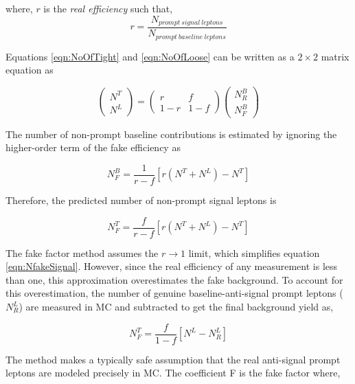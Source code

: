 where, $r$ is the \textit{real efficiency} such that, 
\begin{equation} 
    r=\frac{N_{prompt~signal~leptons}}{N_{prompt~baseline~leptons}}
\end{equation}

Equations \ref{eqn:NoOfTight} and \ref{eqn:NoOfLoose} can be written as a $2 \times 2$ matrix equation as

\begin{equation}
    \begin{pmatrix} N^{T} \\ N^{L} \end{pmatrix} =  \begin{pmatrix} r & f \\ 1-r & 1-f \end{pmatrix} \begin{pmatrix} N^{B}_{R} \\ N^{B}_{F}\end{pmatrix}
    \label{eqn:RealFakeLepton}
\end{equation}

The number of non-prompt baseline contributions is estimated by ignoring the higher-order term of the fake efficiency as

\begin{equation}
    N_{F}^{B} =  \frac{1}{r-f}[r(N^{T}+N^{L})-N^{T}]
    \label{eqn:NfakeBaseline}
\end{equation}

Therefore, the predicted number of non-prompt signal leptons is 

\begin{equation}
    N_{F}^{T} =  \frac{f}{r-f}[r(N^{T}+N^{L})-N^{T}]
\label{eqn:NfakeSignal}
\end{equation}

The fake factor method assumes the $r\rightarrow 1$ limit, which simplifies equation \ref{eqn:NfakeSignal}. However, since the real efficiency of any measurement is less than one, this approximation overestimates the fake background. To account for this overestimation, the number of genuine baseline-anti-signal prompt leptons ($N^{L}_{R}$) are measured in MC and subtracted to get the final background yield as, 

\begin{equation}
    N_{F}^{T} =  \frac{f}{1-f}[N^{L}-N^{L}_{R}]
\label{eqn:NfakeSignalFinal}
\end{equation}

The method makes a typically safe assumption that the real anti-signal prompt leptons are modeled precisely in MC. The coefficient F is the fake factor where, 

